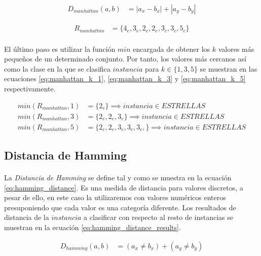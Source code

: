 \documentclass{article}
\begin{document}
			\begin{align}
			\label{eq:manhattan_distance}
				D_{manhattan}(a,b) &= |a_x - b_x| + |a_y - b_y|
			\end{align}

			\begin{align}
			\label{eq:manhattan_distance_results}
				R_{manhattan} &= \{4_e, 3_e, 2_e, 2_e, 3_c, 3_c, 5_c\}
			\end{align}

			\paragraph{}
			El último paso es utilizar la función $min$ encargada de obtener los $k$ valores más pequeños de un determinado conjunto. Por tanto, los valores más cercanos así como la clase en la que se clasifica $instancia$ para $k \in \{1,3,5\}$ se muestran en las ecuaciones \eqref{eq:manhattan_k_1}, \eqref{eq:manhattan_k_3} y \eqref{eq:manhattan_k_5} respectivamente.

			\begin{align}
			\label{eq:manhattan_k_1}
				min(R_{manhattan},1) &= \{ 2_e \}  \implies instancia \in ESTRELLAS \\
			\label{eq:manhattan_k_3}
				min(R_{manhattan},3) &= \{ 2_e, 2_e, 3_e\}  \implies instancia \in ESTRELLAS \\
			\label{eq:manhattan_k_5}
				min(R_{manhattan},5) &= \{ 2_e, 2_e, 3_e, 3_c, 3_c, \} \implies instancia \in ESTRELLAS
			\end{align}

		\subsection{Distancia de Hamming}
		\label{sec:hamming}

			\paragraph{}
			La \emph{Distancia de Hamming} se define tal y como se muestra en la ecuación \eqref{eq:hamming_distance}. Es una medida de distancia para valores discretos, a pesar de ello, en este caso la utilizaremos con valores numéricos enteros presuponiendo que cada valor es una categoría diferente. Los resultados de distancia de la $instancia$ a clasificar con respecto al resto de instancias se muestran en la ecuación \eqref{eq:hamming_distance_results}.


			\begin{align}
			\label{eq:hamming_distance}
				D_{hamming}(a,b) &= (a_x \neq b_x) + (a_y \neq b_y)
			\end{align}
\end{document}
